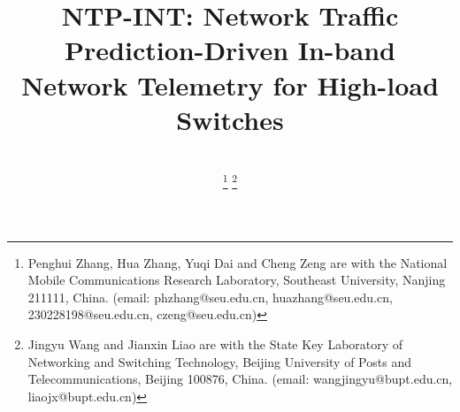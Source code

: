 \documentclass[journal]{IEEEtran}
\begin{document}
\title{NTP-INT: Network Traffic Prediction-Driven In-band Network Telemetry for High-load Switches
\\%
}

\author{
\\
\thanks{Penghui Zhang, Hua Zhang, Yuqi Dai and Cheng Zeng are with the National Mobile Communications Research Laboratory, Southeast University, Nanjing 211111, 
China. (email: phzhang@seu.edu.cn, huazhang@seu.edu.cn, 230228198@seu.edu.cn, czeng@seu.edu.cn)}
\thanks{Jingyu Wang and Jianxin Liao are with the State Key Laboratory of Networking and Switching Technology, Beijing University of Posts and Telecommunications, Beijing 100876, China. (email: wangjingyu@bupt.edu.cn, liaojx@bupt.edu.cn)}
}
\end{document}
